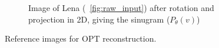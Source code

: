 \begin{figure}
\begin{subfigure}[t]{0.3\textwidth}
    \caption{Image of Lena (\figurename~\ref{fig:raw_input}) after rotation and projection in 2D, giving the \gls{sinugram} (\(P_{\theta}(v)\))
    }\label{fig:sinugram_stretch}
  \end{subfigure}
   \hspace*{\fill}
  \caption{Reference images for \gls{OPT} reconstruction.}\label{fig:rawinputs}
\end{figure}
